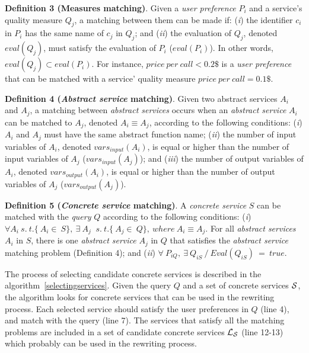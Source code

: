 \noindent \textbf{Definition 3 (Measures matching)}.
Given a \textit{user preference} $P_{i}$ and a service's quality measure $Q_{j}$, a matching between them can be made if: (\textit{i}) the identifier $c_{i}$ in $P_{i}$ has the same name of $c_{j}$ in $Q_{j}$; and
(\textit{ii}) the evaluation of $Q_{j}$, denoted $eval(Q_{j})$, must satisfy the evaluation of $P_{i}$ ($eval(P_{i})$). In other words, $eval(Q_{j}) \subset eval(P_{i})$. For instance, $price \ per \ call < 0.2\$$ is a \textit{user preference} that can be matched with a service' quality measure $price \ per \ call = 0.1\$$.

\noindent \textbf{Definition 4 (\textit{Abstract service} matching)}.
Given two abstract services $A_{i}$ and $A_{j}$, a matching between \textit{abstract services} occurs when an \textit{abstract service} $A_{i}$ can be matched to $A_{j}$, denoted $A_{i} \equiv A_{j}$, according to the following conditions: 
(\textit{i}) $A_{i}$ and $A_{j}$ must have the same abstract function name; 
(\textit{ii}) the number of input variables of $A_{i}$, denoted $vars_{input}(A_{i})$, is equal or higher than the number of input variables of $A_{j}$ ($vars_{input}(A_{j})$); and 
(\textit{iii}) the number of output variables of $A_{i}$, denoted $vars_{output}(A_{i})$, is equal or higher than the number of output variables of $A_{j}$ ($vars_{output}(A_{j})$).

\noindent \textbf{Definition 5 (\textit{Concrete service} matching)}.
A \textit{concrete service} $S$ can be matched with the \textit{query} $Q$ according to the following conditions:
(\textit{i}) $\forall A_{i}  \ s. \ t. \lbrace\ A_{i} \in \ S\rbrace, \ \exists \ A_{j} \ $ $s. \ t. \lbrace\ A_{j} \in \ Q\rbrace, \ where \ A_{i} \equiv A_{j}.$ For all \textit{abstract services} $A_{i}$ in $S$, there is one \textit{abstract service} $A_{j}$ in $Q$ that satisfies the \textit{abstract service} matching problem (Definition 4); and (\textit{ii}) $\forall \ P_{iQ}, \ \exists \ Q_{iS} \ / \ Eval(Q_{iS}) \ = \ true$.

The process of selecting candidate concrete services
is described in the algorithm~\ref{selectingservices}.
Given the query $Q$ and a set of concrete services $\hbox{${\cal S}$}$, the algorithm
looks for concrete services that can be used in the rewriting process.
Each selected service should satisfy the user preferences in $Q$ (line 4), and match with the query (line 7).
The services that satisfy all the matching problems are included in a set of candidate concrete services $\hbox{${\cal L_{S}}$}$ (line 12-13) which probably can be used in the rewriting process.

